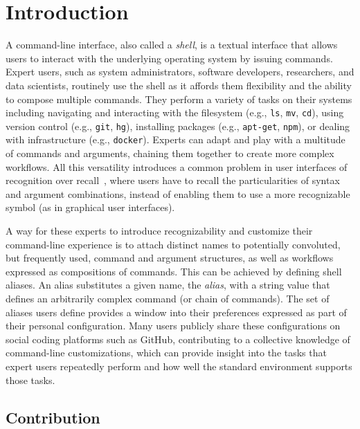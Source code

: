 \documentclass[sigconf,nonacm,screen]{acmart}
\newcommand{\cmd}[1]{{\texttt{#1}}}
\begin{document}
\maketitle

\section{Introduction}

A command-line interface, also called a \emph{shell}, is a textual interface that allows users to interact with the underlying operating system by issuing commands.
Expert users, such as system administrators, software developers, researchers, and data scientists, routinely use the shell as it affords them flexibility and the ability to compose multiple commands.
They perform a variety of tasks on their systems including navigating and interacting with the filesystem (e.g., \cmd{ls}, \cmd{mv}, \cmd{cd}), using version control (e.g., \cmd{git}, \cmd{hg}), installing packages (e.g., \cmd{apt-get}, \cmd{npm}), or dealing with infrastructure (e.g., \cmd{docker}).
Experts can adapt and play with a multitude of commands and arguments, chaining them together to create more complex workflows.
All this versatility introduces a common problem in user interfaces of recognition over recall~\citep{nielsen:05}, where users have to recall the particularities of syntax and argument combinations, instead of enabling them to use a more recognizable symbol (as in graphical user interfaces).

A way for these experts to introduce recognizability and customize their command-line experience is to attach distinct names to potentially convoluted, but frequently used, command and argument structures, as well as workflows expressed as compositions of commands.
This can be achieved by defining shell aliases.
An alias substitutes a given name, the \emph{alias}, with a string value that defines an arbitrarily complex command (or chain of commands).
The set of aliases users define provides a window into their preferences expressed as part of their personal configuration.
Many users publicly share these configurations on social coding platforms such as GitHub, contributing to a collective knowledge of command-line customizations, which can provide insight into the tasks that expert users repeatedly perform and how well the standard environment supports those tasks. 

\subsection{Contribution}
\end{document}
